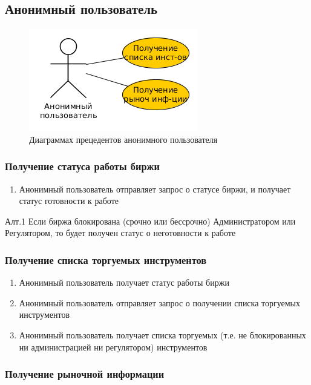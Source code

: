\documentclass[a4paper, 12pt]{article}        %
\begin{document}
\subsection{Анонимный пользователь}

\begin{figure}[H]
\centering
\includegraphics[scale=1]{res/pic03}
\caption{Диаграммах прецедентов анонимного пользователя}
\end{figure}

\subsubsection{Получение статуса работы биржи}

\begin{enumerate}
\item Анонимный пользователь отправляет запрос о статусе биржи, и получает статус готовности к работе
\end{enumerate}

Алт.1 Если биржа блокирована (срочно или бессрочно) Администратором или Регулятором, то будет получен статус о неготовности к работе

\subsubsection{Получение списка торгуемых инструментов}

\begin{enumerate}
\item Анонимный пользователь получает статус работы биржи
\item Анонимный пользователь отправляет запрос о получении списка торгуемых инструментов
\item Анонимный пользователь получает списка торгуемых (т.е. не блокированных ни администрацией ни регулятором) инструментов
\end{enumerate}

\subsubsection{Получение рыночной информации}
\end{document}
